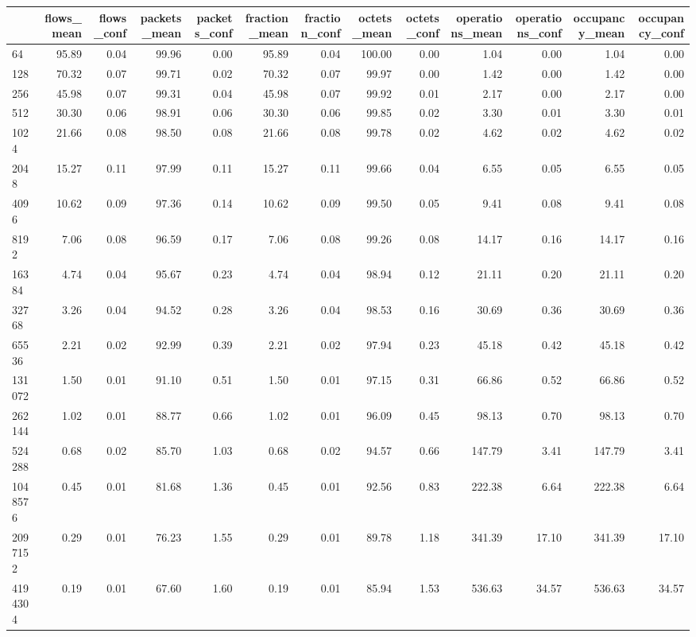 \begin{tabular}{lrrrrrrrrrrrr}
\toprule
 & flows_mean & flows_conf & packets_mean & packets_conf & fraction_mean & fraction_conf & octets_mean & octets_conf & operations_mean & operations_conf & occupancy_mean & occupancy_conf \\
\midrule
64 & 95.89 & 0.04 & 99.96 & 0.00 & 95.89 & 0.04 & 100.00 & 0.00 & 1.04 & 0.00 & 1.04 & 0.00 \\
128 & 70.32 & 0.07 & 99.71 & 0.02 & 70.32 & 0.07 & 99.97 & 0.00 & 1.42 & 0.00 & 1.42 & 0.00 \\
256 & 45.98 & 0.07 & 99.31 & 0.04 & 45.98 & 0.07 & 99.92 & 0.01 & 2.17 & 0.00 & 2.17 & 0.00 \\
512 & 30.30 & 0.06 & 98.91 & 0.06 & 30.30 & 0.06 & 99.85 & 0.02 & 3.30 & 0.01 & 3.30 & 0.01 \\
1024 & 21.66 & 0.08 & 98.50 & 0.08 & 21.66 & 0.08 & 99.78 & 0.02 & 4.62 & 0.02 & 4.62 & 0.02 \\
2048 & 15.27 & 0.11 & 97.99 & 0.11 & 15.27 & 0.11 & 99.66 & 0.04 & 6.55 & 0.05 & 6.55 & 0.05 \\
4096 & 10.62 & 0.09 & 97.36 & 0.14 & 10.62 & 0.09 & 99.50 & 0.05 & 9.41 & 0.08 & 9.41 & 0.08 \\
8192 & 7.06 & 0.08 & 96.59 & 0.17 & 7.06 & 0.08 & 99.26 & 0.08 & 14.17 & 0.16 & 14.17 & 0.16 \\
16384 & 4.74 & 0.04 & 95.67 & 0.23 & 4.74 & 0.04 & 98.94 & 0.12 & 21.11 & 0.20 & 21.11 & 0.20 \\
32768 & 3.26 & 0.04 & 94.52 & 0.28 & 3.26 & 0.04 & 98.53 & 0.16 & 30.69 & 0.36 & 30.69 & 0.36 \\
65536 & 2.21 & 0.02 & 92.99 & 0.39 & 2.21 & 0.02 & 97.94 & 0.23 & 45.18 & 0.42 & 45.18 & 0.42 \\
131072 & 1.50 & 0.01 & 91.10 & 0.51 & 1.50 & 0.01 & 97.15 & 0.31 & 66.86 & 0.52 & 66.86 & 0.52 \\
262144 & 1.02 & 0.01 & 88.77 & 0.66 & 1.02 & 0.01 & 96.09 & 0.45 & 98.13 & 0.70 & 98.13 & 0.70 \\
524288 & 0.68 & 0.02 & 85.70 & 1.03 & 0.68 & 0.02 & 94.57 & 0.66 & 147.79 & 3.41 & 147.79 & 3.41 \\
1048576 & 0.45 & 0.01 & 81.68 & 1.36 & 0.45 & 0.01 & 92.56 & 0.83 & 222.38 & 6.64 & 222.38 & 6.64 \\
2097152 & 0.29 & 0.01 & 76.23 & 1.55 & 0.29 & 0.01 & 89.78 & 1.18 & 341.39 & 17.10 & 341.39 & 17.10 \\
4194304 & 0.19 & 0.01 & 67.60 & 1.60 & 0.19 & 0.01 & 85.94 & 1.53 & 536.63 & 34.57 & 536.63 & 34.57 \\

\end{tabular}
